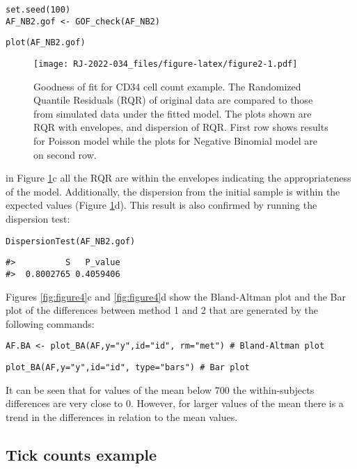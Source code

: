 \begin{verbatim}
set.seed(100)
AF_NB2.gof <- GOF_check(AF_NB2)
\end{verbatim}

\begin{verbatim}
plot(AF_NB2.gof)
\end{verbatim}

\begin{figure}
\centering
\texttt{[image: RJ-2022-034\_files/figure-latex/figure2-1.pdf]}
\caption{\label{fig:figure2}Goodness of fit for CD34 cell count example. The Randomized Quantile Residuals (RQR) of original data are compared to those from simulated data under the fitted model. The plots shown are RQR with envelopes, and dispersion of RQR. First row shows results for Poisson model while the plots for Negative Binomial model are on second row.}
\end{figure}

in Figure \ref{fig:figure2}c all the RQR are within the envelopes indicating the appropriateness of the model. Additionally, the dispersion from the initial sample is within the expected values (Figure \ref{fig:figure2}d). This result is also confirmed by running the dispersion test:

\begin{verbatim}
DispersionTest(AF_NB2.gof)
\end{verbatim}

\begin{verbatim}
#>          S   P_value
#>  0.8002765 0.4059406
\end{verbatim}

Figures \ref{fig:figure4}c and \ref{fig:figure4}d show the Bland-Altman plot and the Bar plot of the differences between method 1 and 2 that are generated by the following commands:

\begin{verbatim}
AF.BA <- plot_BA(AF,y="y",id="id", rm="met") # Bland-Altman plot
\end{verbatim}

\begin{verbatim}
plot_BA(AF,y="y",id="id", type="bars") # Bar plot
\end{verbatim}

It can be seen that for values of the mean below 700 the within-subjects differences are very close to 0. However, for larger values of the mean there is a trend in the differences in relation to the mean values.

\hypertarget{tick-counts-example}{%
\subsection{Tick counts example}\label{tick-counts-example}}

